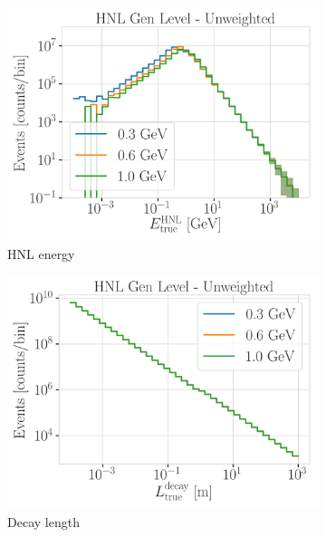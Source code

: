 \begin{figure}[h]
    \centering
    \begin{subfigure}{0.49\linewidth}
        \includegraphics{figures/hnl_simulation/generation/1_d_distr_HNL_true_energy_gen_level_unweighted.png}
        \caption{HNL energy}
    \end{subfigure}
    \begin{subfigure}{0.49\linewidth}
        \includegraphics{figures/hnl_simulation/generation/1_d_distr_distance_gen_level_unweighted.png}
        \caption{Decay length}
    \end{subfigure}
    \begin{subfigure}{0.49\linewidth}

\end{subfigure}
\end{figure}
